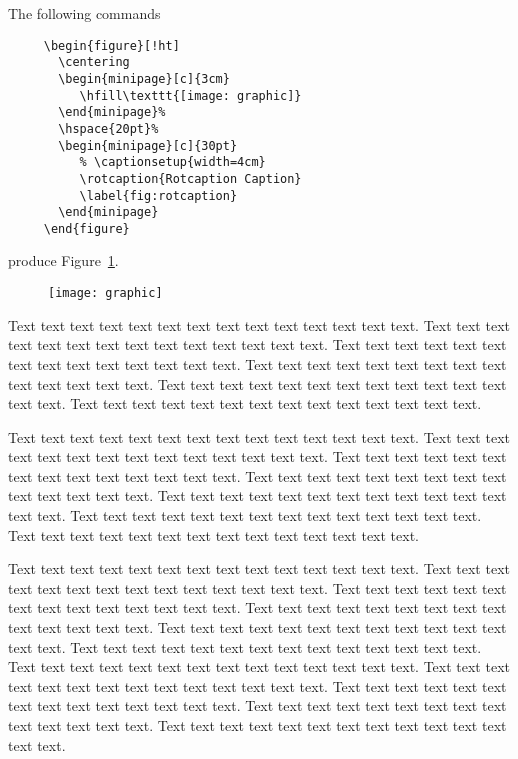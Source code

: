 \documentclass[letterpaper,11pt,oneside,pdftex]{article}
\begin{document}
\noindent
The following commands
\begin{verbatim}
     \begin{figure}[!ht]
       \centering
       \begin{minipage}[c]{3cm}
          \hfill\texttt{[image: graphic]}
       \end{minipage}%
       \hspace{20pt}%
       \begin{minipage}[c]{30pt}
          % \captionsetup{width=4cm}
          \rotcaption{Rotcaption Caption}
          \label{fig:rotcaption}
       \end{minipage}
     \end{figure}
\end{verbatim}
produce Figure~\ref{fig:rotcaption}.

     \begin{figure}[!ht]
       \centering
       \begin{minipage}[c]{3cm}
          \hfill\texttt{[image: graphic]}
       \end{minipage}%
       \hspace{20pt}%
       \begin{minipage}[c]{30pt}
          \label{fig:rotcaption}
       \end{minipage}
     \end{figure}

Text text text text text text text text text text text text text text.
Text text text text text text text text text text text text text text.
Text text text text text text text text text text text text text text.
Text text text text text text text text text text text text text text.
Text text text text text text text text text text text text text text.
Text text text text text text text text text text text text text text.

Text text text text text text text text text text text text text text.
Text text text text text text text text text text text text text text.
Text text text text text text text text text text text text text text.
Text text text text text text text text text text text text text text.
Text text text text text text text text text text text text text text.
Text text text text text text text text text text text text text text.
Text text text text text text text text text text text text text text.

Text text text text text text text text text text text text text text.
Text text text text text text text text text text text text text text.
Text text text text text text text text text text text text text text.
Text text text text text text text text text text text text text text.
Text text text text text text text text text text text text text text.
Text text text text text text text text text text text text text text.
Text text text text text text text text text text text text text text.
Text text text text text text text text text text text text text text.
Text text text text text text text text text text text text text text.
Text text text text text text text text text text text text text text.
Text text text text text text text text text text text text text text.
\end{document}
